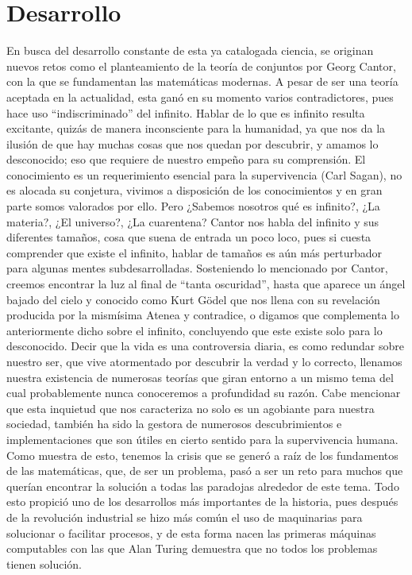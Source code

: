 \documentclass{article}
\begin{document}
\section*{Desarrollo}
En busca del desarrollo constante de esta ya catalogada ciencia, se originan nuevos retos como el planteamiento de la teoría de conjuntos por Georg Cantor, con la que se fundamentan las matemáticas modernas. A pesar de ser una teoría aceptada en la actualidad, esta ganó en su momento varios contradictores, pues hace uso “indiscriminado” del infinito. 
Hablar de lo que es infinito resulta excitante, quizás de manera inconsciente para la humanidad, ya que nos da la ilusión de que hay muchas cosas que nos quedan por descubrir, y amamos lo desconocido; eso que requiere de nuestro empeño para su comprensión. El conocimiento es un requerimiento esencial para la supervivencia (Carl Sagan), no es alocada su conjetura, vivimos a disposición de los conocimientos y en gran parte somos valorados por ello.
Pero ¿Sabemos nosotros qué es infinito?, ¿La materia?, ¿El universo?, ¿La cuarentena?
Cantor nos habla del infinito y sus diferentes tamaños, cosa que suena de entrada un poco loco, pues si cuesta comprender que existe el infinito, hablar de tamaños es aún más perturbador para algunas mentes subdesarrolladas. Sosteniendo lo mencionado por Cantor, creemos encontrar la luz al final de “tanta oscuridad”, hasta que aparece un ángel bajado del cielo y conocido como Kurt Gödel que nos llena con su revelación producida por la mismísima Atenea y contradice, o digamos que complementa lo anteriormente dicho sobre el infinito, concluyendo que este existe solo para lo desconocido.
Decir que la vida es una controversia diaria, es como redundar sobre nuestro ser, que vive atormentado por descubrir la verdad y lo correcto, llenamos nuestra existencia de numerosas teorías que giran entorno a un mismo tema del cual probablemente nunca conoceremos a profundidad su razón.
Cabe mencionar que esta inquietud que nos caracteriza no solo es un agobiante para nuestra sociedad, también ha sido la gestora de numerosos descubrimientos e implementaciones que son útiles en cierto sentido para la supervivencia humana. 
Como muestra de esto, tenemos la crisis que se generó a raíz de los fundamentos de las matemáticas, que, de ser un problema, pasó a ser un reto para muchos que querían encontrar la solución a todas las paradojas alrededor de este tema. Todo esto propició uno de los desarrollos más importantes de la historia, pues después de la revolución industrial se hizo más común el uso de maquinarias para solucionar o facilitar procesos, y de esta forma nacen las primeras máquinas computables con las que Alan Turing demuestra que no todos los problemas tienen solución.
\end{document}
